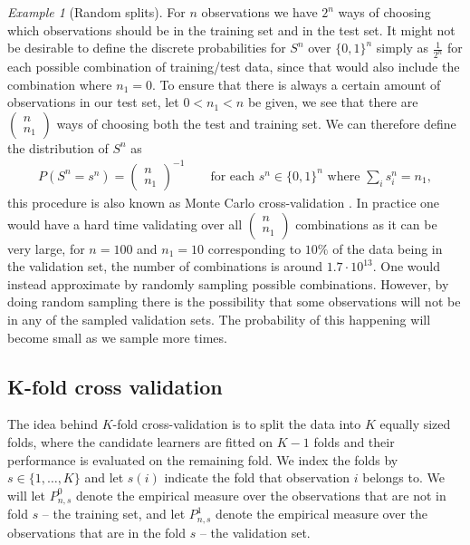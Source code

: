 \documentclass[11pt, a4paper]{article}
\theoremstyle{definition}
\theoremstyle{remark}
\newtheorem{example}{Example}
\newcommand{\Sn}{S^n}
\begin{document}
\begin{example}[Random splits] \label{splits}
   For $ n $ observations we have $ 2^{n} $ ways of choosing which observations should be in the training set and in the test set. It might not be desirable to define the discrete probabilities for $ \Sn $ over $ \{0,1\}^{n} $ simply as $ \frac{1}{2^{n}} $ for each possible combination of training/test data, since that would also include the combination where $ n_1 = 0 $. To ensure that there is always a certain amount of observations in our test set, let $ 0 < n_1 < n $ be given, we see that there are $ \begin{pmatrix}
        n \\ n_1
    \end{pmatrix}$ ways of choosing both the test and training set. We can therefore define the distribution of $ \Sn $ as 
    \begin{align*}
        P \left(\Sn = s^n \right) = \begin{pmatrix}
            n \\ n_1
    \end{pmatrix}^{-1} \qquad \text{for each } s^n \in \{0,1\}^{n} \text{ where } \sum_{i} s^n_i = n_1,
    \end{align*}
    this procedure is also known as Monte Carlo cross-validation \parencite{laan03}. In practice one would have a hard time validating over all $ \begin{pmatrix} n \\ n_1\end{pmatrix} $ combinations as it can be very large, for $ n = 100 $ and $ n_1 = 10 $ corresponding to $ 10\% $ of the data being in the validation set, the number of combinations is around $ 1.7 \cdot 10^{13} $. One would instead approximate by randomly sampling possible combinations. However, by doing random sampling there is the possibility that some observations will not be in any of the sampled validation sets. The probability of this happening will become small as we sample more times.  
\end{example}
\subsection{K-fold cross validation}
The idea behind $ K $-fold cross-validation is to split the data into $ K $ equally sized folds, where the candidate learners are fitted on $ K - 1 $ folds and their performance is evaluated on the remaining fold. We index the folds by $ s \in \{1, \dots , K\} $ and let $ s(i) $ indicate the fold that observation $ i $ belongs to. We will let $ P_{n, s}^{0} $ denote the empirical measure over the observations that are not in fold $ s $ -- the training set, and let $ P_{n, s}^{1} $ denote the empirical measure over the observations that are in the fold $ s $ -- the validation set. 
\end{document}
